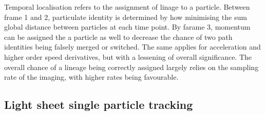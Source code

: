 Temporal localisation refers to the assignment of linage to a particle.
Between frame 1 and 2, particulate identity is determined by how minimising the sum global distance between particles at each time point.
By farame 3, momentum can be assigned the a particle as well to decrease the chance of two path identities being falsely merged or switched.
The same applies for acceleration and higher order speed derivatives, but with a lessening of overall significance.
The overall chance of a lineage being correctly assigned largely relies on the sampling rate of the imaging, with higher rates being favourable.




\subsection{Light sheet single particle tracking}

